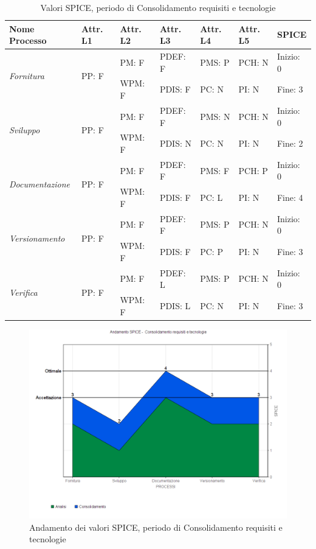 \documentclass[openany,12pt,a4paper]{report}
\begin{document}
\begin{table}[h]
	\begin{center}
		\setlength\LTleft{-22mm}
		\begin{longtable}{|p{35mm}|p{20mm}|p{20mm}|p{20mm}|p{20mm}|p{20mm}|p{20mm}|}
			\hline
			\textbf{Nome Processo} & \textbf{Attr. L1} & \textbf{Attr. L2} & \textbf{Attr. L3} & \textbf{Attr. L4} & \textbf{Attr. L5} & \textbf{SPICE}\\
			\hline
			\multirow{2}{*}{\textit{Fornitura}} & \multirow{2}{*}{PP: F} & PM: F & PDEF: F & PMS: P & PCH: N & Inizio: 0\\  
			\cline{3-7}
			&          & WPM: F & PDIS: F & PC: N & PI: N & Fine: 3 \\ 
			\hline
			\multirow{2}{*}{\textit{Sviluppo}} & \multirow{2}{*}{PP: F} & PM: F & PDEF: F & PMS: N & PCH: N & Inizio: 0\\  \cline{3-7}
			&          & WPM: F & PDIS: N & PC: N & PI: N & Fine: 2\\
			\hline\multirow{2}{*}{\textit{Documentazione}} & \multirow{2}{*}{PP: F} & PM: F & PDEF: F & PMS: F & PCH: P & Inizio: 0\\  \cline{3-7}
			&          & WPM: F & PDIS: F & PC: L & PI: N & Fine: 4\\ 
			\hline\multirow{2}{*}{\textit{Versionamento}} & \multirow{2}{*}{PP: F} & PM: F & PDEF: F & PMS: P & PCH: N & Inizio: 0\\  \cline{3-7}
			&          & WPM: F & PDIS: F & PC: P & PI: N & Fine: 3\\ 
			\hline\multirow{2}{*}{\textit{Verifica}} & \multirow{2}{*}{PP: F} & PM: F & PDEF: L & PMS: P & PCH: N & Inizio: 0\\  \cline{3-7}
			&          & WPM: F & PDIS: L & PC: N & PI: N & Fine: 3\\ 
			\hline       
		\end{longtable}
	\end{center}
	\caption{Valori SPICE, periodo di Consolidamento requisiti e tecnologie} 
\end{table}

\begin{figure}[H]
	\includegraphics[scale=0.5]{verifica-consolidamento-spice}
	\centering
	\caption{Andamento dei valori SPICE, periodo di Consolidamento requisiti e tecnologie}
\end{figure}
\end{document}

